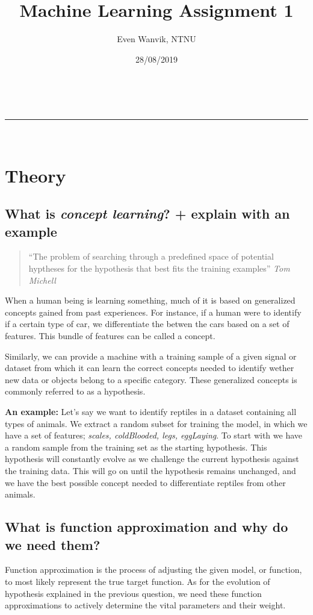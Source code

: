 \documentclass[a4paper,11pt]{article}
\makeatletter
\newcommand{\linia}{\rule{\linewidth}{0.5pt}}
\theoremstyle{mytheor}
\renewcommand{\maketitle}{
\begin{center}
\vspace{2ex}
{\huge \textsc{\@title}}
\vspace{1ex}
\\
\linia\\
\@author \hfill \@date
\vspace{4ex}
\end{center}
}
\makeatother
\begin{document}
\title{Machine Learning Assignment 1}

\author{Even Wanvik, NTNU}

\date{28/08/2019}

\maketitle

\section{Theory}

\subsection{What is \textit{concept learning}? + explain with an example}
\begin{quotation}
  ``The problem of searching through a predefined space of potential hyptheses for the hypothesis that best fits the training examples''
  \em Tom Michell
\end{quotation}
When a human being is learning something, much of it is based on generalized concepts gained from past experiences. For instance, if a human were to identify if a certain type of car, we differentiate the betwen the cars based on a set of features. This bundle of features can be called a concept. 

Similarly, we can provide a machine with a training sample of a given signal or dataset from which it can learn the correct concepts needed to identify wether new data or objects belong to a specific category. These generalized concepts is commonly referred to as a hypothesis. 

\textbf{An example:} Let's say we want to identify reptiles in a dataset containing all types of animals. We extract a random subset for training the model, in which we have a set of features; \textit{scales, coldBlooded, legs, eggLaying}. To start with we have a random sample from the training set as the starting hypothesis. This hypothesis will constantly evolve as we challenge the current hypothesis against the training data. This will go on until the hypothesis remains unchanged, and we have the best possible concept needed to differentiate reptiles from other animals.


\subsection{What is function approximation and why do we need them?}
Function approximation is the process of adjusting the given model, or function, to most likely represent the true target function. As for the evolution of hypothesis explained in the previous question, we need these function approximations to actively determine the vital parameters and their weight.
\end{document}
